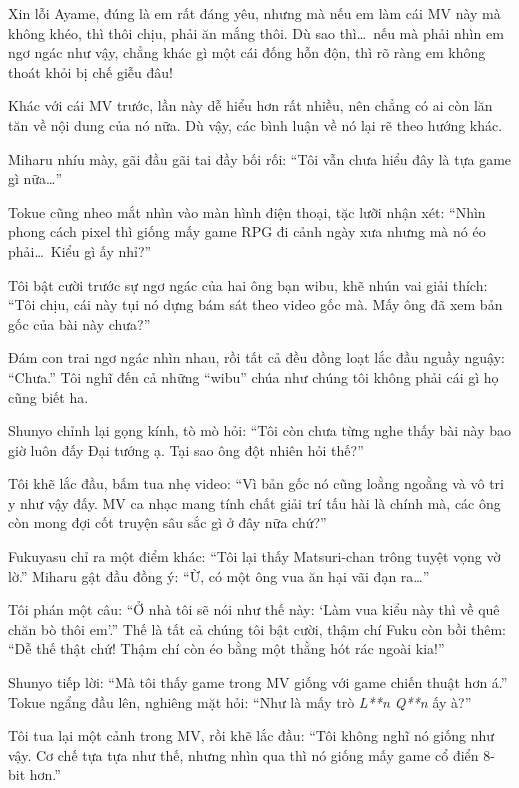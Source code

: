\documentclass[../main.tex]{subfiles}
\begin{document}
Xin lỗi Ayame, đúng là em rất đáng yêu, nhưng mà nếu em làm cái MV này mà không khéo, thì thôi chịu, phải ăn mắng thôi. Dù sao thì\dots\ nếu mà phải nhìn em ngơ ngác như vậy, chẳng khác gì một cái đống hỗn độn, thì rõ ràng em không thoát khỏi bị chế giễu đâu!

Khác với cái MV trước, lần này dễ hiểu hơn rất nhiều, nên chẳng có ai còn lăn tăn về nội dung của nó nữa. Dù vậy, các bình luận về nó lại rẽ theo hướng khác.

Miharu nhíu mày, gãi đầu gãi tai đầy bối rối: ``Tôi vẫn chưa hiểu đây là tựa game gì nữa\dots''

Tokue cũng nheo mắt nhìn vào màn hình điện thoại, tặc lưỡi nhận xét: ``Nhìn phong cách pixel thì giống mấy game RPG đi cảnh ngày xưa nhưng mà nó éo phải\dots\ Kiểu gì ấy nhỉ?''

Tôi bật cười trước sự ngơ ngác của hai ông bạn wibu, khẽ nhún vai giải thích: ``Tôi chịu, cái này tụi nó dựng bám sát theo video gốc mà. Mấy ông đã xem bản gốc của bài này chưa?''

Đám con trai ngơ ngác nhìn nhau, rồi tất cả đều đồng loạt lắc đầu nguầy nguậy: ``Chưa.'' Tôi nghĩ đến cả những ``wibu'' chúa như chúng tôi không phải cái gì họ cũng biết ha.

Shunyo chỉnh lại gọng kính, tò mò hỏi: ``Tôi còn chưa từng nghe thấy bài này bao giờ luôn đấy Đại tướng ạ. Tại sao ông đột nhiên hỏi thế?''

Tôi khẽ lắc đầu, bấm tua nhẹ video: ``Vì bản gốc nó cũng loằng ngoằng và vô tri y như vậy đấy. MV ca nhạc mang tính chất giải trí tấu hài là chính mà, các ông còn mong đợi cốt truyện sâu sắc gì ở đây nữa chứ?''

Fukuyasu chỉ ra một điểm khác: ``Tôi lại thấy Matsuri-chan trông tuyệt vọng vờ lờ.'' Miharu gật đầu đồng ý: ``Ừ, có một ông vua ăn hại vãi đạn ra\dots''

Tôi phán một câu: ``Ở nhà tôi sẽ nói như thế này: `Làm vua kiểu này thì về quê chăn bò thôi em'.'' Thế là tất cả chúng tôi bật cười, thậm chí Fuku còn bồi thêm: ``Dễ thế thật chứ! Thậm chí còn éo bằng một thằng hót rác ngoài kia!''

Shunyo tiếp lời: ``Mà tôi thấy game trong MV giống với game chiến thuật hơn á.'' Tokue ngẩng đầu lên, nghiêng mặt hỏi: ``Như là mấy trò \textit{L**n Q**n} ấy à?''

Tôi tua lại một cảnh trong MV, rồi khẽ lắc đầu: ``Tôi không nghĩ nó giống như vậy. Cơ chế tựa tựa như thế, nhưng nhìn qua thì nó giống mấy game cổ điển 8-bit hơn.''
\end{document}
